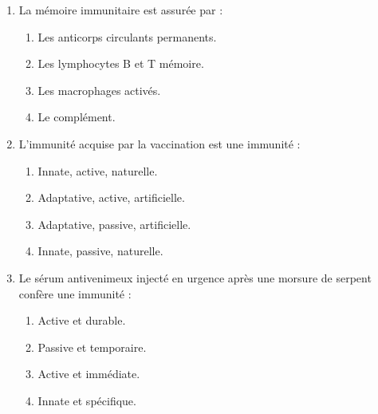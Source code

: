 \documentclass[11pt]{article}
\begin{document}
\begin{exercice}
\begin{enumerate}
    \item La mémoire immunitaire est assurée par :
    \begin{enumerate}
        \item Les anticorps circulants permanents.
        \item Les lymphocytes B et T mémoire.
        \item Les macrophages activés.
        \item Le complément.
    \end{enumerate}
    \item L'immunité acquise par la vaccination est une immunité :
    \begin{enumerate}
        \item Innate, active, naturelle.
        \item Adaptative, active, artificielle.
        \item Adaptative, passive, artificielle.
        \item Innate, passive, naturelle.
    \end{enumerate}
    \item Le sérum antivenimeux injecté en urgence après une morsure de serpent confère une immunité :
    \begin{enumerate}
        \item Active et durable.
        \item Passive et temporaire.
        \item Active et immédiate.
        \item Innate et spécifique.
    \end{enumerate}
\end{enumerate}
\end{exercice}
\end{document}
